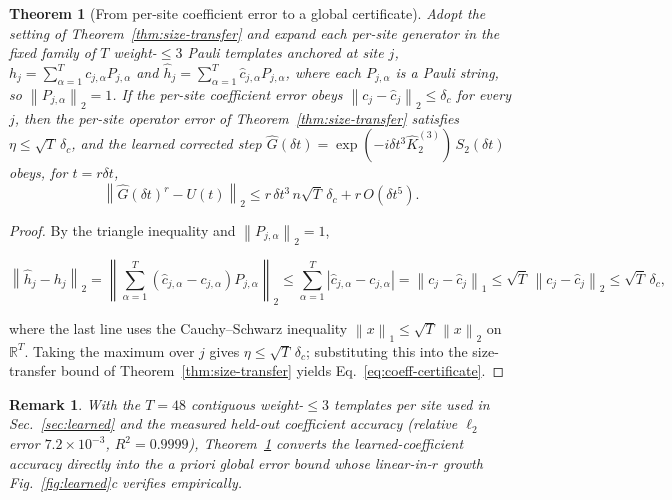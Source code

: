 \documentclass[aps,prresearch,reprint,superscriptaddress,nofootinbib,amsmath,amssymb]{revtex4-2}
\newcommand{\norm}[1]{\left\lVert #1 \right\rVert}
\newcommand{\abs}[1]{\left\lvert #1 \right\rvert}
\newcommand{\dt}{\delta t}
\newtheorem{theorem}{Theorem}
\newtheorem{remark}{Remark}
\begin{document}
\begin{theorem}[From per-site coefficient error to a global certificate]
\label{thm:coeff-certificate}
Adopt the setting of Theorem~\ref{thm:size-transfer} and expand each per-site generator in the fixed family of $T$ weight-$\leq3$ Pauli templates anchored at site $j$, $h_j=\sum_{\alpha=1}^{T}c_{j,\alpha}P_{j,\alpha}$ and $\widehat h_j=\sum_{\alpha=1}^{T}\widehat c_{j,\alpha}P_{j,\alpha}$, where each $P_{j,\alpha}$ is a Pauli string, so $\norm{P_{j,\alpha}}_2=1$. If the per-site coefficient error obeys $\norm{c_j-\widehat c_j}_2\leq\delta_c$ for every $j$, then the per-site operator error of Theorem~\ref{thm:size-transfer} satisfies $\eta\leq\sqrt{T}\,\delta_c$, and the learned corrected step $\widehat G(\dt)=\exp(-i\dt^3\widehat K_2^{(3)})\,S_2(\dt)$ obeys, for $t=r\dt$,
\begin{equation}
    \norm{\widehat G(\dt)^r-U(t)}_2\leq r\,\dt^3\,n\sqrt{T}\,\delta_c+r\,O(\dt^5).
    \label{eq:coeff-certificate}
\end{equation}
\end{theorem}

\begin{proof}
By the triangle inequality and $\norm{P_{j,\alpha}}_2=1$,
\begin{widetext}
\begin{equation*}
    \norm{\widehat h_j-h_j}_2=\norm{\sum_{\alpha=1}^{T}(\widehat c_{j,\alpha}-c_{j,\alpha})P_{j,\alpha}}_2\leq\sum_{\alpha=1}^{T}\abs{\widehat c_{j,\alpha}-c_{j,\alpha}}=\norm{c_j-\widehat c_j}_1\leq\sqrt{T}\,\norm{c_j-\widehat c_j}_2\leq\sqrt{T}\,\delta_c,
\end{equation*}
\end{widetext}
where the last line uses the Cauchy--Schwarz inequality $\norm{x}_1\leq\sqrt{T}\,\norm{x}_2$ on $\mathbb{R}^T$. Taking the maximum over $j$ gives $\eta\leq\sqrt{T}\,\delta_c$; substituting this into the size-transfer bound of Theorem~\ref{thm:size-transfer} yields Eq.~\eqref{eq:coeff-certificate}.
\end{proof}

\begin{remark}
With the $T=48$ contiguous weight-$\leq3$ templates per site used in Sec.~\ref{sec:learned} and the measured held-out coefficient accuracy (relative $\ell_2$ error $7.2\times10^{-3}$, $R^2=0.9999$), Theorem~\ref{thm:coeff-certificate} converts the learned-coefficient accuracy directly into the \emph{a priori} global error bound whose linear-in-$r$ growth Fig.~\ref{fig:learned}c verifies empirically.
\end{remark}
\end{document}
